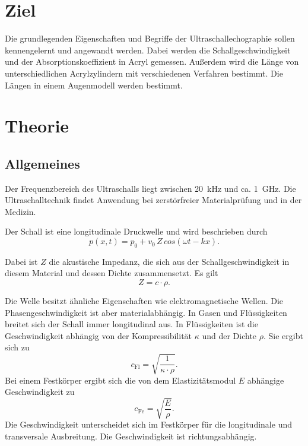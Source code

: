\section{Ziel}
Die grundlegenden Eigenschaften und Begriffe der
Ultraschallechographie sollen kennengelernt und angewandt
werden. Dabei werden die Schallgeschwindigkeit und der Absorptionskoeffizient in Acryl gemessen.
Außerdem wird die Länge von unterschiedlichen Acrylzylindern mit verschiedenen Verfahren bestimmt.
Die Längen in einem Augenmodell werden bestimmt. %

\section{Theorie}
\label{sec:Theorie}
\subsection{Allgemeines} %
Der Frequenzbereich des Ultraschalls liegt zwischen 
\SI{20}{\kilo\hertz} und ca. \SI{1}{\giga\hertz}. 
Die Ultraschalltechnik findet Anwendung bei 
zerstörfreier Materialprüfung und in der Medizin. 

\noindent Der Schall ist eine longitudinale Druckwelle und wird 
beschrieben durch
\begin{equation*}
    p(x,t) = p_0 + v_0 \, Z \, cos(\omega t - kx).
\end{equation*}

\noindent Dabei ist $Z$ die akustische Impedanz, die sich aus der 
Schallgeschwindigkeit in diesem Material und dessen Dichte 
zusammensetzt. Es gilt 
\begin{equation*}
    Z = c \cdot \rho.
\end{equation*}

\noindent Die Welle besitzt ähnliche Eigenschaften wie 
elektromagnetische Wellen. Die Phasengeschwindigkeit 
ist aber materialabhängig. 
In Gasen und Flüssigkeiten breitet 
sich der Schall immer longitudinal aus. In Flüssigkeiten ist 
die Geschwindigkeit abhängig von der Kompressibilität 
$\kappa$ und der Dichte $\rho$. 
Sie ergibt sich zu 
\begin{equation*}
    c_{\text{Fl}}= \sqrt{\frac{1}{\kappa \cdot \rho}}.
\end{equation*}
Bei einem Festkörper ergibt sich die von dem Elastizitätsmodul
$E$ abhängige Geschwindigkeit zu 
\begin{equation*}
    c_{\text{Fe}}= \sqrt{\frac{E}{\rho}}.
\end{equation*}
Die Geschwindigkeit unterscheidet 
sich im Festkörper für die longitudinale und
transversale Ausbreitung. Die Geschwindigkeit ist richtungsabhängig.

